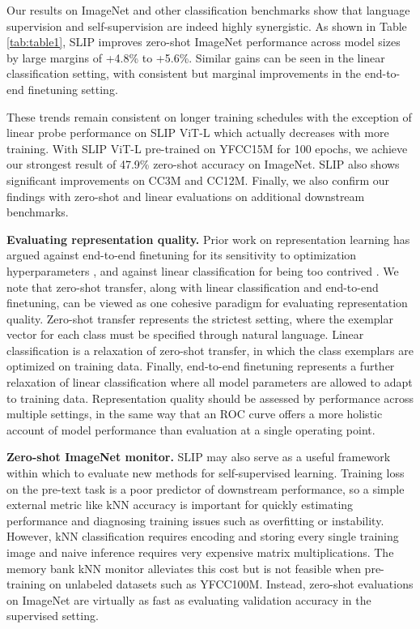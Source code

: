 \documentclass[10pt,twocolumn,letterpaper]{article}
\renewcommand{\paragraph}[1]{\vspace{1.25mm}\noindent\textbf{#1}}
\begin{document}
Our results on ImageNet and other classification benchmarks show that language supervision and self-supervision are indeed highly synergistic.
As shown in Table \ref{tab:table1}, SLIP improves zero-shot ImageNet performance across model sizes by large margins of +4.8\% to +5.6\%.
Similar gains can be seen in the linear classification setting, with consistent but marginal improvements in the end-to-end finetuning setting.

These trends remain consistent on longer training schedules with the exception of linear probe performance on SLIP ViT-L which actually decreases with more training.
With SLIP ViT-L pre-trained on YFCC15M for 100 epochs, we achieve our strongest result of 47.9\% zero-shot accuracy on ImageNet.
SLIP also shows significant improvements on CC3M and CC12M.
Finally, we also confirm our findings with zero-shot and linear evaluations on additional downstream benchmarks.

\paragraph{Evaluating representation quality.}
Prior work on representation learning has argued against end-to-end finetuning for its sensitivity to optimization hyperparameters \cite{Goyal2019ScalingAB}, and  against linear classification for being too contrived \cite{Zhai2019ALS}.
We note that zero-shot transfer, along with linear classification and end-to-end finetuning, can be viewed as one cohesive paradigm for evaluating representation quality.
Zero-shot transfer represents the strictest setting, where the exemplar vector for each class must be specified through natural language.
Linear classification is a relaxation of zero-shot transfer, in which the class exemplars are optimized on training data.
Finally, end-to-end finetuning represents a further relaxation of linear classification where all model parameters are allowed to adapt to training data.
Representation quality should be assessed by performance across multiple settings, in the same way that an ROC curve offers a more holistic account of model performance than evaluation at a single operating point.

\paragraph{Zero-shot ImageNet monitor.}
SLIP may also serve as a useful framework within which to evaluate new methods for self-supervised learning.
Training loss on the pre-text task is a poor predictor of downstream performance, so a simple external metric like kNN accuracy is important for quickly estimating performance and diagnosing training issues such as overfitting or instability.
However, kNN classification requires encoding and storing every single training image and naive inference requires very expensive matrix multiplications.
The memory bank kNN monitor \cite{Chen2021AnES} alleviates this cost but is not feasible when pre-training on unlabeled datasets such as YFCC100M.
Instead, zero-shot evaluations on ImageNet are virtually as fast as evaluating validation accuracy in the supervised setting.
\end{document}
